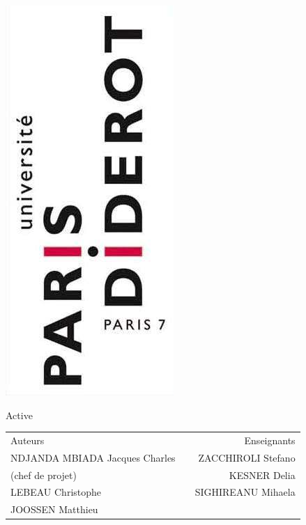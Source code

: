 \documentclass[a4paper,12pt]{report}
\begin{document}
\begin{titlepage}

\begin{flushright}
\includegraphics[scale=0.75]{"images/logo_p7"}
\end{flushright}

\selectfont
{}
\begin{center}\Huge{}\selectfont
Active
\end{center}

\begin{tabularx}{\linewidth}{lXr}
Auteurs && Enseignants\\
NDJANDA MBIADA Jacques Charles && ZACCHIROLI Stefano\\
(chef de projet) && KESNER Delia\\
LEBEAU Christophe && SIGHIREANU Mihaela\\
JOOSSEN Matthieu &&
\end{tabularx}

\end{titlepage}



\glsaddall
\printglossaries

\tableofcontents











\clearpage
{}
\printindex
\end{document}
